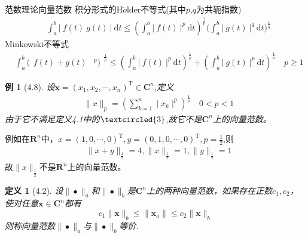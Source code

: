 \documentclass{sintefbeamer}[dark]
\newtheorem*{定义}{定义}
\newtheorem*{例}{例}
\begin{document}
	\begin{frame}{范数理论}{向量范数}
		积分形式的H$\ddot{o}$lder不等式(其中$p$,$q$为共轭指数)
		\begin{equation*}
			\begin{aligned}
				&\int_a^b\big|\:f(t)\:g(t)\:\big|\:\mathrm{d}t\leqslant(\int_a^b\big|\:f(t)\:\big|^p\:\mathrm{d}t)^{\frac{1}{p}}\big(\int_a^b\big|\:g(t)\:\big|^q\:\mathrm{d}t\big)^{\frac{1}{q}}
			\end{aligned}
		\end{equation*} 
		Minkowski不等式
		\begin{equation*}
			\begin{aligned}
				&\int_{a}^{b}(\begin{array}{c|c|c}f(t)+g(t)&^{p})\end{array}^{\frac{1}{p}}\leqslant(\int_{a}^{b}\bigg|\:f(t)\:\bigg|^{p}\:\mathrm{d}t)^{\frac{1}{p}}+(\int_{a}^{b}\bigg|\:g(t)\:\bigg|^{p}\:\mathrm{d}t)^{\frac{1}{p}}\quad p\geqslant1
			\end{aligned}
		\end{equation*} 
\end{frame}

\begin{frame}
	\begin{例}[4.8]
		设$\boldsymbol{x}=(x_1,x_2,\cdots,x_n)^{\mathrm{T}}\in\mathbf{C}^n$,定义
		\begin{equation*}
			\begin{aligned}
				&\parallel x\parallel_p=(\sum_{k=1}^n\mid x_k\mid^p)^{\frac{1}{p}}\quad0<p<1
			\end{aligned}
		\end{equation*}
		由于它不满足定义4.1中的$\textcircled{3}$,故它不是$\mathbf{C}^n$上的向量范数。
	\end{例}
		例如在$\mathbf{R}^n$中，$x=(1,0,\cdots,0)^{\mathrm{T}},y=(0,1,0,\cdots,0)^{\mathrm{T}},p=\frac{1}{2}$,则
        \begin{equation*}
			\begin{aligned}
				&\parallel x+y\parallel_{\frac12}=4,\parallel x\parallel_{\frac12}=1,\parallel y\parallel_{\frac12}=1
			\end{aligned}
		\end{equation*}
		故$\parallel x\parallel_{\frac12}$不是$\mathbf{R}^n$上的向量范数。
\end{frame}

\begin{frame}
	\begin{定义}[4.2]
		设$\|\bullet\|_{a}$和$\|\bullet\|_{b}$是$\mathbf{C}^{n}$上的两种向量范数，如果存在正数$c_{1},c_{2}$，使对任意$\bm{x}\in\mathbf{C}^{n}$都有
		$$
		c_{1}\|\bm{x}\|_{b}\le\|\bm{x}_{a}\|\le c_{2}\|\bm{x}\|_{b}
		$$
		\linebreak
		则称向量范数$\|\bullet\|_{a}$与$\|\bullet\|_{b}$等价.
		\end{定义}
\end{frame}
\end{document}
